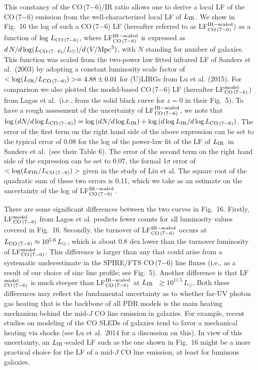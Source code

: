 \documentclass[preprint]{aastex}
\newcommand{\LIR}{\mbox{$L_{\rm IR}$}}
\begin{document}
This constancy of the CO\,(7$-$6)/IR ratio allows one to derive a local LF 
of the CO\,(7$-$6) emission from the well-characterized local LF of \LIR.  
We show in Fig.~16 the log of such a CO\,(7$-$6) LF (hereafter referred to 
as LF$_{\rm CO\,(7-6)}^{\rm IR-scaled}$) as a function of $\log\,L_{\rm CO\,(7-6)}$,
where LF$_{\rm CO\,(7-6)}^{\rm IR-scaled}$ is expressed as 
$d\,N/d\log(L_{\rm CO\,(7-6)}/L_{\odot})/d\,(V/{\rm Mpc}^3)$, with $N$ standing 
for number of galaxies.
This function was scaled from the two-power law fitted infrared LF of Sanders 
et al.~(2003) by adopting a constant luminosity scale factor of 
$<\log(L_{\rm IR}/L_{\rm CO\,(7-6)})> = 4.88 \pm 0.01$ for (U)LIRGs from 
Lu et al. (2015).    For comparison we also plotted the model-based 
CO\,(7$-$6) LF (hereafter LF$_{\rm CO\,(7-6)}^{\rm model}$) from Lagos 
et al.~(i.e., from the solid black curve for $z = 0$ in their Fig.~5). 
To have a rough assessment of the uncertainty of LF$_{\rm CO\,(7-6)}^{\rm IR-scaled}$, 
we note that  $\log\,(dN/d\log L_{\rm CO\,(7-6)}) =  \log\,(dN/d\log L_{\rm IR}) 
	 + \log\,(d\log L_{\rm IR}/d\log L_{\rm CO\,(7-6)})$. 
The error of the first term on the right hand side of the above expression 
can be set to the typical error of 0.08 for the log of the power-law fit of 
the LF of \LIR\ in Sanders et al.~(see their Table 6). The error of the second 
term on the right hand side of the expression can be set to 0.07, the formal
1$\sigma$ error of $<\log(L_{\rm FIR}/L_{\rm CO\,(7-6)})>$ given in the study
of Liu et al.  The square root of the quadratic sum of these two errors is 
0.11, which we take as an estimate on the uncertainty of the log of 
LF$_{\rm CO\,(7-6)}^{\rm IR-scaled}$.


There are some significant differences between the two curves in Fig.~16. 
Firstly, LF$_{\rm CO\,(7-6)}^{\rm model}$ from Lagos et al. predicts fewer counts 
for all luminosity values covered in Fig.~16.  Secondly, 
the turnover of LF$_{\rm CO\,(7-6)}^{\rm IR-scaled}$ occurs at $L_{\rm CO\,(7-6)} 
\approx 10^{5.6}\,L_{\odot}$, which is about 0.8 dex lower than the turnover 
luminosity of LF$_{\rm CO\,(7-6)}^{\rm model}$.
This difference is larger than any that could arise from a systematic underestimate
in the SPIRE/FTS CO\,(7$-$6) line fluxes (i.e., as a result of our choice 
of sinc line profile; see Fig.~5).  Another difference is that LF$_{\rm CO\,(7-6)}^{\rm model}$
is much steeper than LF$_{\rm CO\,(7-6)}^{\rm IR-scaled}$ at \LIR\ $\gtrsim 10^{11.5}\,L_{\odot}$.
Both these differences may reflect the fundamental uncertainty as to whether 
far-UV photon gas heating that is the backbone of all PDR models is the main 
heating mechanism behind the mid-$J$ CO line emission in galaxies. For example,
recent studies on modeling of the CO SLEDs of galaxies tend to favor a 
mechanical heating via shocks (see Lu et al.~2014 for a discussion on this). 
In view of this uncertainty, an \LIR-scaled LF such as the one shown in Fig.~16 
might be a more practical choice for the LF of a mid-$J$ CO line emission, 
at least for luminous galaxies.
\end{document}
